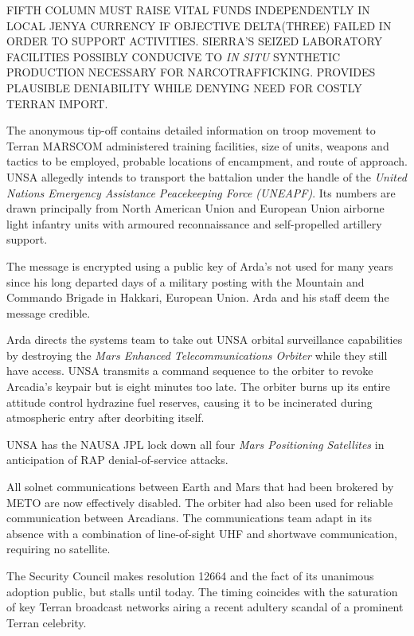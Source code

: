     \item FIFTH COLUMN MUST RAISE VITAL FUNDS INDEPENDENTLY IN LOCAL JENYA CURRENCY IF OBJECTIVE DELTA(THREE) FAILED IN ORDER TO SUPPORT ACTIVITIES. SIERRA'S SEIZED LABORATORY FACILITIES POSSIBLY CONDUCIVE TO {\it IN SITU} SYNTHETIC PRODUCTION NECESSARY FOR NARCOTRAFFICKING. PROVIDES PLAUSIBLE DENIABILITY WHILE DENYING NEED FOR COSTLY TERRAN IMPORT.
    \stopitemize
\stopitemize

\stopTimelineCorrespondenceDocument

The anonymous tip-off contains detailed information on troop movement to Terran MARSCOM administered training facilities, size of units, weapons and tactics to be employed, probable locations of encampment, and route of approach. UNSA allegedly intends to transport the battalion under the handle of the {\it United Nations Emergency Assistance Peacekeeping Force (UNEAPF)}. Its numbers are drawn principally from North American Union and European Union airborne light infantry units with armoured reconnaissance and self-propelled artillery support.

The message is encrypted using a public key of Arda's not used for many years since his long departed days of a military posting with the Mountain and Commando Brigade in Hakkari, European Union. Arda and his staff deem the message credible.
\StopTimelineDate

Arda directs the systems team to take out UNSA orbital surveillance capabilities by destroying the {\it Mars Enhanced Telecommunications Orbiter} while they still have access. UNSA transmits a command sequence to the orbiter to revoke Arcadia's keypair but is eight minutes too late. The orbiter burns up its entire attitude control hydrazine fuel reserves, causing it to be incinerated during atmospheric entry after deorbiting itself.

UNSA has the NAUSA JPL lock down all four {\it Mars Positioning Satellites} in anticipation of RAP denial-of-service attacks.

All solnet communications between Earth and Mars that had been brokered by METO are now effectively disabled. The orbiter had also been used for reliable communication between Arcadians. The communications team adapt in its absence with a combination of line-of-sight UHF and shortwave communication, requiring no satellite.
\StopTimelineDate

The Security Council makes resolution 12664 and the fact of its unanimous adoption public, but stalls until today. The timing coincides with the saturation of key Terran broadcast networks airing a recent adultery scandal of a prominent Terran celebrity.
\StopTimelineDate

